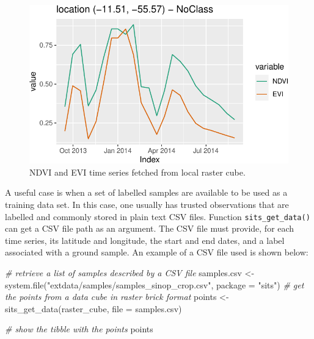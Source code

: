 \documentclass[a4paper,]{tufte-book}
\newenvironment{Shaded}{}{}
\newcommand{\AttributeTok}[1]{\textcolor[rgb]{0.49,0.56,0.16}{#1}}
\newcommand{\CommentTok}[1]{\textcolor[rgb]{0.38,0.63,0.69}{\textit{#1}}}
\newcommand{\FunctionTok}[1]{\textcolor[rgb]{0.02,0.16,0.49}{#1}}
\newcommand{\NormalTok}[1]{#1}
\newcommand{\OtherTok}[1]{\textcolor[rgb]{0.00,0.44,0.13}{#1}}
\newcommand{\StringTok}[1]{\textcolor[rgb]{0.25,0.44,0.63}{#1}}
\begin{document}
\begin{figure}

{\centering \includegraphics[width=0.7\linewidth]{sitsbook_files/figure-latex/unnamed-chunk-30-1} 

}

\caption[NDVI and EVI time series fetched from local raster cube]{NDVI and EVI time series fetched from local raster cube.}\label{fig:unnamed-chunk-30}
\end{figure}

A useful case is when a set of labelled samples are available to be used as a training data set. In this case, one usually has trusted observations that are labelled and commonly stored in plain text CSV files. Function \texttt{sits\_get\_data()} can get a CSV file path as an argument. The CSV file must provide, for each time series, its latitude and longitude, the start and end dates, and a label associated with a ground sample. An example of a CSV file used is shown below:

\begin{Shaded}
\begin{Highlighting}[]
\CommentTok{\# retrieve a list of samples described by a CSV file}
\NormalTok{samples.csv }\OtherTok{\textless{}{-}} \FunctionTok{system.file}\NormalTok{(}\StringTok{"extdata/samples/samples\_sinop\_crop.csv"}\NormalTok{,}
                           \AttributeTok{package =} \StringTok{"sits"}\NormalTok{)}
\CommentTok{\# get the points from a data cube in raster brick format}
\NormalTok{points }\OtherTok{\textless{}{-}} \FunctionTok{sits\_get\_data}\NormalTok{(raster\_cube, }\AttributeTok{file =}\NormalTok{ samples.csv)}


\CommentTok{\# show the tibble with the points}
\NormalTok{points}
\end{Highlighting}
\end{Shaded}
\end{document}
